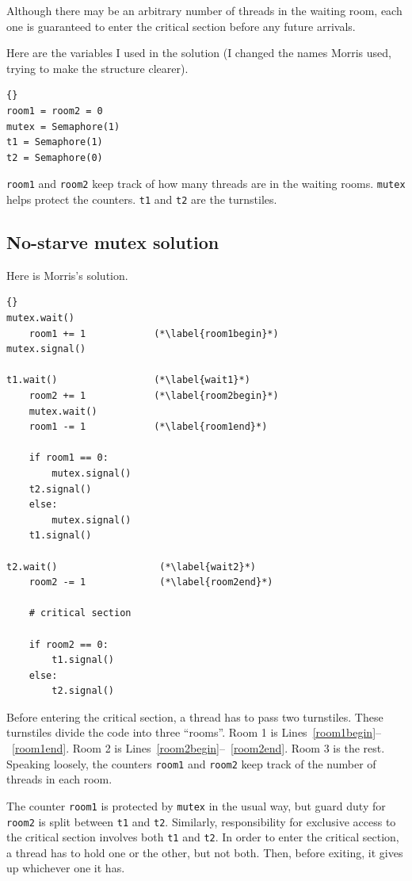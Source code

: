 \documentclass{book}
\newcommand{\clearemptydoublepage}{\newpage\cleardoublepage}
\begin{document}
Although there may be an arbitrary number of threads in the waiting
room, each one is guaranteed to enter the critical section before any
future arrivals.

Here are the variables I used in the solution (I changed the
names Morris used, trying to make the structure clearer).

\begin{lstlisting}[title={No-starve mutex hint}]{}
room1 = room2 = 0
mutex = Semaphore(1)
t1 = Semaphore(1)
t2 = Semaphore(0)
\end{lstlisting}

{\tt room1} and {\tt room2} keep track of how many threads are in the
waiting rooms.  {\tt mutex} helps protect the counters.  {\tt t1} and
{\tt t2} are the turnstiles.


\clearemptydoublepage
\subsection{No-starve mutex solution}

Here is Morris's solution.

\begin{lstlisting}[title={Morris's algorithm}]{}
mutex.wait()
    room1 += 1            (*\label{room1begin}*)
mutex.signal()
                           
t1.wait()                 (*\label{wait1}*)
    room2 += 1            (*\label{room2begin}*)
    mutex.wait()
    room1 -= 1            (*\label{room1end}*)

    if room1 == 0: 
        mutex.signal()
	t2.signal()
    else: 
        mutex.signal()
	t1.signal()

t2.wait()                  (*\label{wait2}*)
    room2 -= 1             (*\label{room2end}*)

    # critical section

    if room2 == 0:
        t1.signal()
    else:
        t2.signal()
\end{lstlisting}

Before entering the critical section, a thread has to pass two
turnstiles.  These turnstiles divide the code into three ``rooms''.
Room 1 is Lines~\ref{room1begin}--~\ref{room1end}.  Room 2 is
Lines~\ref{room2begin}--~\ref{room2end}.  Room 3 is the rest.
Speaking loosely, the counters {\tt room1} and {\tt room2} keep track
of the number of threads in each room.

The counter {\tt room1} is protected by {\tt mutex} in the usual way,
but guard duty for {\tt room2} is split between {\tt t1} and {\tt t2}.
Similarly, responsibility for exclusive access to the critical section
involves both {\tt t1} and {\tt t2}.  In order to enter the critical
section, a thread has to hold one or the other, but not both.  Then,
before exiting, it gives up whichever one it has.
\end{document}
